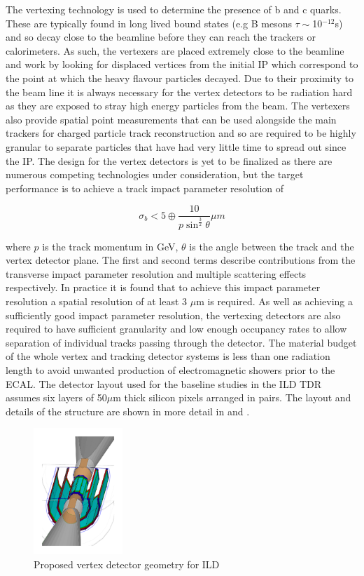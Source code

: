 The vertexing technology is used to determine the presence of b and c quarks. These are typically found in long lived bound states (e.g B mesons $\tau\sim$10$^{-12}$s) and so decay close to the beamline before they can reach the trackers or calorimeters. As such, the vertexers are placed extremely close to the beamline and work by looking for displaced vertices from the initial \ac{IP} which correspond to the point at which the heavy flavour particles decayed. Due to their proximity to the beam line it is always necessary for the vertex detectors to be radiation hard as they are exposed to stray high energy particles from the beam. The vertexers also provide spatial point measurements that can be used alongside the main trackers for charged particle track reconstruction and so are required to be highly granular to separate particles that have had very little time to spread out since the \ac{IP}. The design for the vertex detectors is yet to be finalized as there are numerous competing technologies under consideration, but the target performance\cite{ILCTDR} is to achieve a track impact parameter resolution of

\begin{equation}
\sigma_{b} < 5 \oplus \frac{10}{p\sin^{\frac{3}{2}}\theta}\mu m
\end{equation}

where $p$ is the track momentum in GeV, $\theta$ is the angle between the track and the vertex detector plane. The first and second terms describe contributions from the transverse impact parameter resolution and multiple scattering effects respectively.  In practice it is found that to achieve this impact parameter resolution a spatial resolution of at least 3 $\mu$m is required. As well as achieving a sufficiently good impact parameter resolution, the vertexing detectors are also required to have sufficient granularity and low enough occupancy rates to allow separation of individual tracks passing through the detector. The material budget of the whole vertex and tracking detector systems is less than one radiation length to avoid unwanted production of electromagnetic showers prior to the \ac{ECAL}. The detector layout used for the baseline studies in the \ac{ILD} \ac{TDR} assumes six layers of 50$\mu$m thick silicon pixels arranged in pairs. The layout and details of the structure are shown in more detail in  and .

\begin{figure}
  \centering
  \includegraphics[width=0.3\textwidth,keepaspectratio]{Experiments/fig/Vertex}
  \caption[ILD Vertex Detector]{Proposed vertex detector geometry for ILD \cite{ILD}}
  \label{fig:VTX}
\end{figure}

